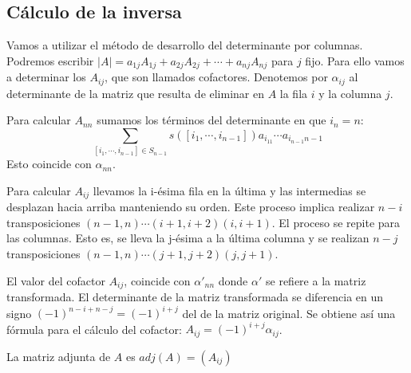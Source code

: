 \subsection{Cálculo de la inversa}

Vamos a utilizar el método de desarrollo del determinante por columnas. Podremos escribir $|A| = a_{1j}A_{1j} + a_{2j}A_{2j}+ \cdots + a_{nj}A_{nj}$ para $j$ fijo. Para ello vamos a determinar los $A_{ij}$, que son llamados cofactores. Denotemos por $\alpha_{ij}$ al determinante de la matriz que resulta de eliminar en $A$ la fila $i$ y la columna $j$.

Para calcular $A_{nn}$ sumamos los términos del determinante en que $i_n = n$: $$\sum_{[i_1,\cdots,i_{n-1}] \in S_{n-1}} s([i_1,\cdots,i_{n-1}]) a_{i_11} \cdots a_{i_{n-1}n-1}$$ Esto coincide con $\alpha_{nn}$. 

Para calcular $A_{ij}$ llevamos la i-ésima fila en la última y las intermedias se desplazan hacia arriba manteniendo su orden. Este proceso implica realizar $n-i$ transposiciones $(n-1,n) \cdots (i+1,i+2)(i,i+1)$. El proceso se repite para las columnas. Esto es, se lleva la j-ésima a la última columna y se realizan $n-j$ transposiciones $(n-1,n)\cdots(j+1,j+2)(j,j+1)$.

El valor del cofactor $A_{ij}$, coincide con $\alpha'_{nn}$ donde $\alpha'$ se refiere a la matriz transformada. El determinante de la matriz transformada se diferencia en un signo $(-1)^{n-i+n-j} = (-1)^{i+j}$ del de la matriz original. Se obtiene así una fórmula para el cálculo del cofactor: $A_{ij} = (-1)^{i+j}\alpha_{ij}$. 

\begin{definition}
La matriz adjunta de $A$ es $adj(A) = (A_{ij})$
\end{definition}

